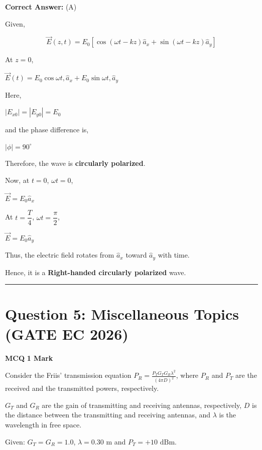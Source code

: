 \documentclass[11pt,a4paper]{article}
\begin{document}
\noindent \textbf{Correct Answer:} (A)

\begin{tcolorbox}[solbox, title=Detailed Solution -- Question 4]
Given, 

\[
\vec{E}(z,t)=E_0\left[\cos(\omega t-kz)\hat{a}_x+\sin(\omega t-kz)\hat{a}_y\right]
\]

At $z=0$, 

$\vec{E}(t)=E_0\cos\omega t , \hat{a}_x + E_0\sin\omega t , \hat{a}_y$

Here, 

$|E_{x0}|=|E_{y0}|=E_0$

and the phase difference is, 

$|\phi|=90^\circ$

Therefore, the wave is \textbf{circularly polarized}. 

Now, at $t=0$, $\omega t=0$, 

$\vec{E}=E_0\hat{a}_x$

At $t=\dfrac{T}{4}$, $\omega t=\dfrac{\pi}{2}$, 

$\vec{E}=E_0\hat{a}_y$

Thus, the electric field rotates from $\hat{a}_x$ toward $\hat{a}_y$ with time. 

Hence, it is a \textbf{Right-handed circularly polarized} wave.
\end{tcolorbox}

\vspace{1.5em}
\hrule
\vspace{1.5em}

\section*{Question 5: Miscellaneous Topics (GATE EC 2026)}
\noindent \textbf{\color{primary}MCQ} \hfill \textbf{\color{secondary}1 Mark}


\noindent Consider the Friis' transmission equation $P_R = \frac{P_T G_T G_R \lambda^2}{(4\pi D)^2}$, where $P_R$ and $P_T$ are the received and the transmitted powers, respectively. 

$G_T$ and $G_R$ are the gain of transmitting and receiving antennas, respectively, $D$ is the distance between the transmitting and receiving antennas, and $\lambda$ is the wavelength in free space.

Given: $G_T = G_R = 1.0$, $\lambda = 0.30 \text{ m}$ and $P_T = +10 \text{ dBm}$.
\end{document}
